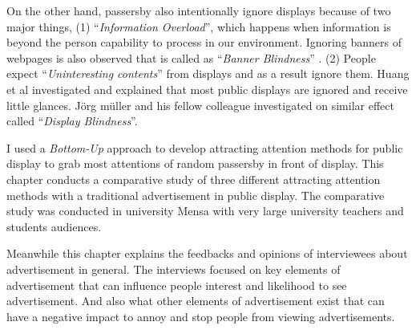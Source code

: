 On the other hand, passersby also intentionally ignore displays because of two major things, (1) ``\emph{Information Overload}'', which happens when information is beyond the person capability to process in our environment\cite{Information_overload}. Ignoring banners of webpages is also observed that is called as ``\emph{Banner Blindness}'' \cite{banner_blindness}. (2) People expect ``\emph{Uninteresting contents}'' from displays and as a result ignore them. Huang et al \cite{When_display} investigated and explained that most public displays are ignored and receive little glances. Jörg müller and his fellow colleague \cite{display_blindness} investigated on similar effect called ``\emph{Display Blindness}''. 


I used a \emph{Bottom-Up} approach to develop attracting attention methods for public display to grab most attentions of random passersby in front of display. This chapter conducts a comparative study of three different attracting attention methods with a traditional advertisement in public display. The comparative study was conducted in university Mensa with very large university teachers and students audiences.

Meanwhile this chapter explains the feedbacks and opinions of interviewees about advertisement in general. The interviews focused on key elements of advertisement that can influence people interest and likelihood to see advertisement. And also what other elements of advertisement exist that can have a negative impact to annoy and stop people from viewing advertisements.






